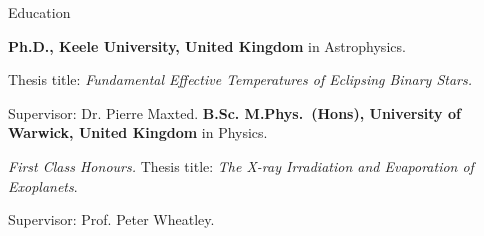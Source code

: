 \begin{rubric}{Education}

\entry*[2018 -- 2022]%
	\textbf{Ph.D., Keele University, United Kingdom} in Astrophysics.
	\par Thesis title: \emph{Fundamental Effective Temperatures of Eclipsing Binary Stars.} \par Supervisor: Dr. Pierre Maxted.
%
\entry*[2014 -- 2018]%
	\textbf{B.Sc. M.Phys.~(Hons), University of Warwick, United Kingdom} in Physics.
	\par \emph{First Class Honours.}
	Thesis title: \emph{The X-ray Irradiation and Evaporation of Exoplanets}. \par Supervisor: Prof. Peter Wheatley.
\end{rubric}